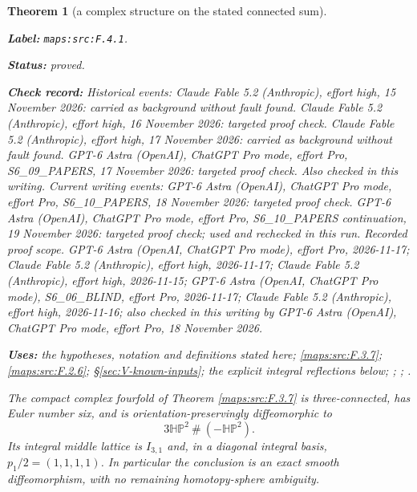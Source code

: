 \documentclass[11pt,a4paper]{article}
\newtheorem{theorem}{Theorem}[section]
\theoremstyle{definition}
\newcommand{\StatementRecord}[4]{\par\smallskip\begingroup\upshape\raggedright\noindent\textbf{Label:} \nolinkurl{#1}.\par\noindent\textbf{Status:} #2.\par\noindent\textbf{Check record:} #3.\par\noindent\textbf{Uses:} #4.\par\endgroup\smallskip}
\begin{document}
\begin{theorem}[a complex structure on the stated connected sum]\label{maps:src:F.4.1}
\StatementRecord{maps:src:F.4.1}{proved}{Historical events: Claude Fable 5.2 (Anthropic), effort high, 15 November 2026: carried as background without fault found. Claude Fable 5.2 (Anthropic), effort high, 16 November 2026: targeted proof check. Claude Fable 5.2 (Anthropic), effort high, 17 November 2026: carried as background without fault found. GPT-6 Astra (OpenAI), ChatGPT Pro mode, effort Pro, S6\_09\_PAPERS, 17 November 2026: targeted proof check. Also checked in this writing. Current writing events: GPT-6 Astra (OpenAI), ChatGPT Pro mode, effort Pro, S6\_10\_PAPERS, 18 November 2026: targeted proof check. GPT-6 Astra (OpenAI), ChatGPT Pro mode, effort Pro, S6\_10\_PAPERS continuation, 19 November 2026: targeted proof check; used and rechecked in this run. \emph{Recorded proof scope.} GPT-6 Astra (OpenAI, ChatGPT Pro mode), effort Pro, 2026-11-17; Claude Fable 5.2 (Anthropic), effort high, 2026-11-17; Claude Fable 5.2 (Anthropic), effort high, 2026-11-15; GPT-6 Astra (OpenAI, ChatGPT Pro mode), S6\_06\_BLIND, effort Pro, 2026-11-17; Claude Fable 5.2 (Anthropic), effort high, 2026-11-16; also checked in this writing by GPT-6 Astra (OpenAI), ChatGPT Pro mode, effort Pro, 18 November 2026}{the hypotheses, notation and definitions stated here; \cref{maps:src:F.3.7}; \cref{maps:src:F.2.6}; \S\ref{sec:V-known-inputs}; the explicit integral reflections below; \cite[Corollary 1.4, p.~4]{ffMandal}; \cite[Definition 3.6 and Theorem 3.7(1), pp.~12--14]{IVVWallForm}; \cite[Theorem A, p.~178]{IVVKramerStolz}}


The compact complex fourfold of Theorem \ref{maps:src:F.3.7} is three-connected,
has Euler number six, and is orientation-preservingly diffeomorphic to
\[
 3\mathbb H\mathbb P^2\ \#\ (-\mathbb H\mathbb P^2).
 \tag{F.25}\label{maps:eq:F.25}
\]
Its integral middle lattice is $I_{3,1}$ and, in a diagonal integral
basis, $p_1/2=(1,1,1,1)$.  In particular the conclusion is an exact
smooth diffeomorphism, with no remaining homotopy-sphere ambiguity.

\end{theorem}
\end{document}
